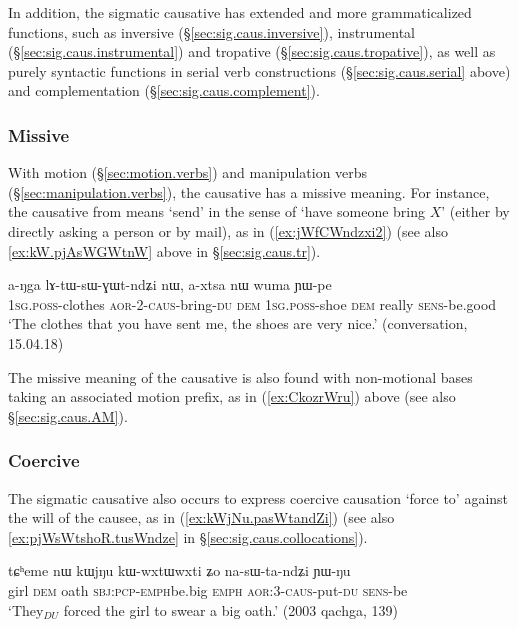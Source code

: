 In addition, the sigmatic causative has extended and more grammaticalized functions, such as inversive (§\ref{sec:sig.caus.inversive}), instrumental (§\ref{sec:sig.caus.instrumental}) and tropative (§\ref{sec:sig.caus.tropative}), as well as purely syntactic functions in serial verb constructions (§\ref{sec:sig.caus.serial} above) and complementation (§\ref{sec:sig.caus.complement}).

\subsubsection{Missive} \label{sec:sig.caus.missive}
With motion (§\ref{sec:motion.verbs}) and manipulation verbs (§\ref{sec:manipulation.verbs}), the causative has a missive meaning. For instance, the causative  from  means `send' in the sense of `have someone bring $X$' (either by directly asking a person or by mail), as in (\ref{ex:jWfCWndzxi2}) (see also \ref{ex:kW.pjAsWGWtnW} above in §\ref{sec:sig.caus.tr}).

\begin{exe}
\ex \label{ex:jWfCWndzxi2}
\gll a-ŋga lɤ-tɯ-sɯ-ɣɯt-ndʑi nɯ, a-xtsa nɯ wuma ɲɯ-pe \\ 
\textsc{1sg}.\textsc{poss}-clothes \textsc{aor}-2-\textsc{caus}-bring-\textsc{du} \textsc{dem} \textsc{1sg}.\textsc{poss}-shoe \textsc{dem} really \textsc{sens}-be.good  \\
\glt `The clothes that you have sent me, the shoes are very nice.' (conversation, 15.04.18)
\end{exe}

The missive meaning of the causative is also found with non-motional bases taking an associated motion prefix, as in (\ref{ex:CkozrWru}) above (see also §\ref{sec:sig.caus.AM}).

\subsubsection{Coercive} \label{sec:sig.caus.coercitive}
The sigmatic causative also occurs to express coercive causation `force to' against the will of the causee, as in (\ref{ex:kWjNu.pasWtandZi}) (see also \ref{ex:pjWsWtshoR.tusWndze} in §\ref{sec:sig.caus.collocations}).

\begin{exe}
\ex \label{ex:kWjNu.pasWtandZi}
\gll tɕʰeme nɯ kɯjŋu kɯ-wxtɯ\redp{}wxti ʑo na-sɯ-ta-ndʑi ɲɯ-ŋu \\
girl \textsc{dem} oath \textsc{sbj}:\textsc{pcp}-\textsc{emph}\redp{}be.big \textsc{emph} \textsc{aor}:3\flobv{}-\textsc{caus}-put-\textsc{du} \textsc{sens}-be \\
\glt `They$_{DU}$ forced the girl to swear a big oath.' (2003 qachga, 139)
\end{exe}

